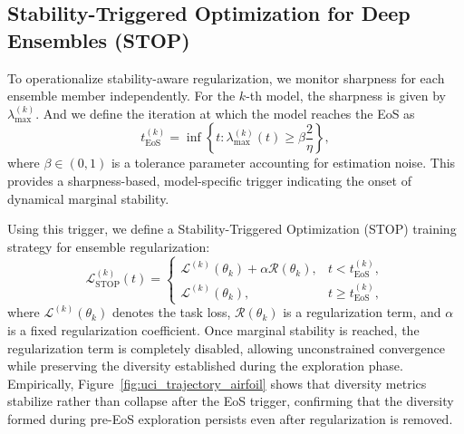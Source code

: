 \documentclass[sigconf]{acmart}
\begin{document}
\subsection{Stability-Triggered Optimization for Deep Ensembles (STOP)}

To operationalize stability-aware regularization, we monitor sharpness for each ensemble member independently.
For the $k$-th model, the sharpness is given by $\lambda_{\max}^{(k)}$.
And we define the iteration at which the model reaches the EoS as
\begin{equation}
t_{\mathrm{EoS}}^{(k)}
=
\inf
\left\{
t : \lambda_{\max}^{(k)}(t) \ge \beta \frac{2}{\eta}
\right\},
\label{eq:STOP_time}
\end{equation}
where $\beta \in (0,1)$ is a tolerance parameter accounting for estimation noise.
This provides a sharpness-based, model-specific trigger indicating the onset of
dynamical marginal stability.

Using this trigger, we define a Stability-Triggered Optimization (STOP) training strategy for ensemble regularization:
\begin{equation}
\mathcal{L}_{\mathrm{STOP}}^{(k)}(t)
=
\begin{cases}
\mathcal{L}^{(k)}(\theta_k) + \alpha \mathcal{R}(\theta_k), & t < t_{\mathrm{EoS}}^{(k)}, \\[2mm]
\mathcal{L}^{(k)}(\theta_k), & t \ge t_{\mathrm{EoS}}^{(k)},
\end{cases}
\label{eq:stability_triggered_objective}
\end{equation}
where $\mathcal{L}^{(k)}(\theta_k)$ denotes the task loss, $\mathcal{R}(\theta_k)$ is a
regularization term, and $\alpha$ is a fixed regularization coefficient.
Once marginal stability is reached, the regularization term is completely disabled, allowing
unconstrained convergence while preserving the diversity established during the exploration phase.
Empirically, Figure~\ref{fig:uci_trajectory_airfoil} shows that diversity metrics stabilize rather than collapse after the EoS trigger, confirming that the diversity formed during pre-EoS exploration persists even after regularization is removed.
\end{document}
